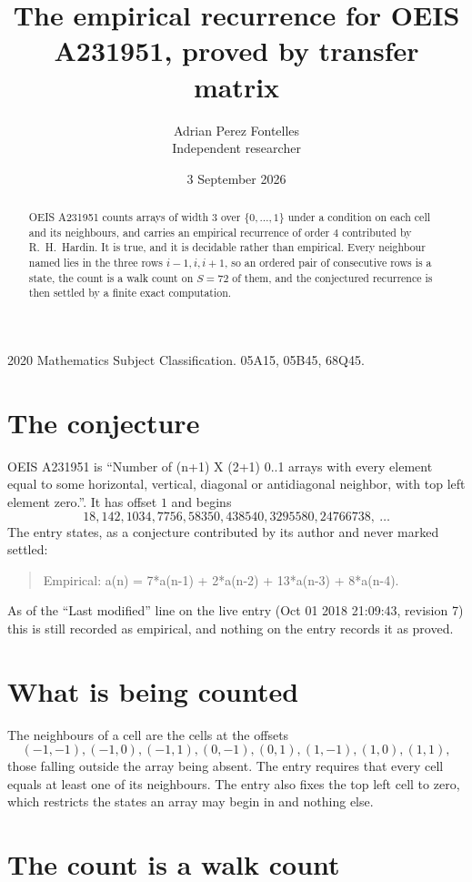 \documentclass[11pt,a4paper]{article}
\title{The empirical recurrence for OEIS A231951, proved by transfer matrix}
\author{Adrian Perez Fontelles\\ \small Independent researcher}
\date{3 September 2026}
\theoremstyle{plain}
\theoremstyle{definition}
\begin{document}
\maketitle

\begin{abstract}
OEIS A231951 counts arrays of width $3$ over $\{0,\dots,1\}$ under a condition on each cell
and its neighbours, and carries an empirical recurrence of order $4$ contributed by
R.~H.~Hardin. It is true, and it is decidable rather than empirical. Every neighbour named lies
in the three rows $i-1,i,i+1$, so an ordered pair of consecutive rows is a state, the count is
a walk count on $S=72$ of them, and the conjectured recurrence is then settled by a finite
exact computation.
\end{abstract}

\noindent\small 2020 Mathematics Subject Classification. 05A15, 05B45, 68Q45.\normalsize

\section{The conjecture}

OEIS A231951 is ``Number of (n+1) X (2+1) 0..1 arrays with every element equal to some horizontal, vertical, diagonal or antidiagonal neighbor, with top left element zero.''. It has offset $1$ and begins
\[
18, 142, 1034, 7756, 58350, 438540, 3295580, 24766738,\ \dots
\]
The entry states, as a conjecture contributed by its author and never marked settled:
\begin{quote}
Empirical: a(n) = 7*a(n-1) + 2*a(n-2) + 13*a(n-3) + 8*a(n-4).
\end{quote}
As of the ``Last modified'' line on the live entry (Oct 01 2018 21:09:43, revision 7) this is still
recorded as empirical, and nothing on the entry records it as proved.

\section{What is being counted}

The neighbours of a cell are the cells at the offsets
\[
(-1,-1), (-1,0), (-1,1), (0,-1), (0,1), (1,-1), (1,0), (1,1),
\]
those falling outside the array being absent. The entry requires that every cell equals at least one of its neighbours. The entry also fixes the top left cell to zero, which restricts the states an array may begin in and nothing else.

\section{The count is a walk count}
\end{document}

